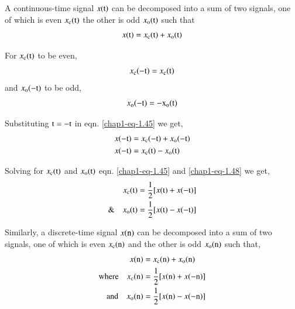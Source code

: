 A continuous-time signal $x(\textrm{t})$ can be decomposed into a sum of two signals, one of which is even $x_{\textrm{c}}(\textrm{t})$ the other is odd $x_{\textrm{o}}(\textrm{t})$ such that
\begin{equation}\label{chap1-eq-1.45}
x(\textrm{t}) = x_{\textrm{c}}(\textrm{t}) + x_{\textrm{o}}(\textrm{t})
\end{equation}

For $x_{\textrm{c}}(\textrm{t})$ to be even,
\begin{equation}\label{chap1-eq-1.46}
x_{\textrm{c}}(-\textrm{t})=x_{\textrm{c}}(\textrm{t})
\end{equation}
and $x_{\textrm{o}}(-\textrm{t})$ to be odd,
\begin{equation}\label{chap1-eq-1.47}
x_{\textrm{o}}(-\textrm{t})=-\textrm{x}_{\textrm{o}}(\textrm{t})
\end{equation}

Substituting $\textrm{t}=-\textrm{t}$ in eqn. \ref{chap1-eq-1.45} we get,
\begin{align}
x(-\textrm{t}) &=x_{\textrm{c}}(-\textrm{t})+ x_{\textrm{o}}(-\textrm{t})\nonumber\\
x(-\textrm{t}) &=x_{\textrm{c}}(\textrm{t})- x_{\textrm{o}}(\textrm{t})\label{chap1-eq-1.48}
\end{align}

Solving for $x_{\textrm{c}}(\textrm{t})$ and $x_{\textrm{o}}(\textrm{t})$ eqn. \ref{chap1-eq-1.45} and \ref{chap1-eq-1.48} we get,
\begin{align}
x_{\textrm{c}}(\textrm{t}) &= \frac{1}{2}[x(\textrm{t})+ x(-\textrm{t})]\label{chap1-eq-1.49}\\
\& \quad x_{\textrm{o}}(\textrm{t}) &=\frac{1}{2}[x(\textrm{t})- x(-\textrm{t})]\label{chap1-eq-1.50}
\end{align}

Similarly, a discrete-time signal $x(\textrm{n})$ can be decomposed into a sum of two signals, one of which is even $x_{\textrm{c}}(\textrm{n})$ and the other is odd $x_{\textrm{o}}(\textrm{n})$ such that,
\begin{align}
x(\textrm{n}) &= x_{\textrm{c}}(\textrm{n})+ x_{\textrm{o}}(\textrm{n})\label{chap1-eq-1.51}\\
\text{where} \quad x_{\textrm{c}}(\textrm{n}) &= \frac{1}{2}[x(\textrm{n}) + x(-\textrm{n})]\label{chap1-eq-1.52}\\
\text{and} \quad x_{\textrm{o}}(\textrm{n}) &= \frac{1}{2}[x(\textrm{n})-x(-\textrm{n})]\label{chap1-eq-1.53}
\end{align}


